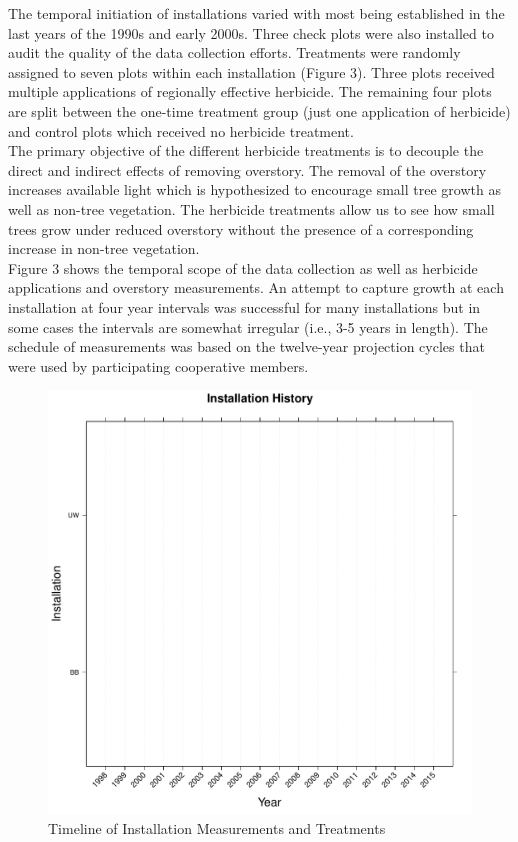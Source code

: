 \documentclass[11pt, letterpaper, fleqn]{article}
\begin{document}
The temporal initiation of installations varied with most being established in the last years of the 1990s and early 2000s.  Three check plots were also installed to audit the quality of the data collection efforts. Treatments were randomly assigned to seven plots within each installation (Figure 3).  Three plots received multiple applications of regionally effective herbicide.  The remaining four plots are split between the one-time treatment group (just one application of herbicide) and control plots which received no herbicide treatment.\\[2pt]

The primary objective of the different herbicide treatments is to decouple the direct and indirect effects of removing overstory. The removal of the overstory increases available light which is hypothesized to encourage small tree growth as well as non-tree vegetation.  The herbicide treatments allow us to see how small trees grow under reduced overstory without the presence of a corresponding increase in non-tree vegetation.\\[2pt]

Figure 3 shows the temporal scope of the data collection as well as herbicide applications and overstory measurements. An attempt to capture growth at each installation at four year intervals was successful for many installations but in some cases the intervals are somewhat irregular (i.e., 3-5 years in length). The schedule of measurements was based on the twelve-year projection cycles that were used by participating cooperative members.\\[2pt]
\begin{figure}
\begin{center}

\includegraphics{Thesis_doc-007}
\caption{Timeline of Installation Measurements and Treatments}
\label{fig:timeline}
\end{center}
\end{figure}
\end{document}
